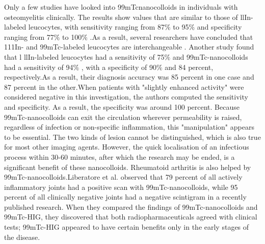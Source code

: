\documentclass[12pt]{article}
\begin{document}
Only a few studies have looked into 99mTcnanocolloids in individuals with osteomyelitis clinically. The results show values that are similar to those of llIn-labeled leucocytes, with sensitivity ranging from 87$\%$  to 95$\%$  and specificity ranging from 77$\%$  to 100$\%$ .As a result, several researchers have concluded that 111In- and 99mTc-labeled leucocytes are interchangeable . Another study  found that l llIn-labeled leucocytes had a sensitivity of 75$\%$  and 99mTc-nanocolloids had a sensitivity of 94$\%$ , with a specificity of 90$\%$  and 84 percent, respectively.As a result, their diagnosis accuracy was 85 percent in one case and 87 percent in the other.When patients with "slightly enhanced activity" were considered negative in this investigation, the authors computed the sensitivity and specificity. As a result, the specificity was around 100 percent. Because 99mTc-nanocolloids can exit the circulation wherever permeability is raised, regardless of infection or non-specific inflammation, this "manipulation" appears to be essential. The two kinds of lesion cannot be distinguished, which is also true for most other imaging agents. However, the quick localisation of an infectious process within 30-60 minutes, after which the research may be ended, is a significant benefit of these nanocolloids.
Rheumatoid arthritis is also helped by 99mTc-nanocolloids.Liberatore et al. observed that 79 percent of all actively inflammatory joints had a positive scan with 99mTc-nanocolloids, while 95 percent of all clinically negative joints had a negative scintigram in a recently published research. When they compared the findings of 99mTc-nanocolloids and 99mTc-HIG, they discovered that both radiopharmaceuticals agreed with clinical tests; 99mTc-HIG appeared to have certain benefits only in the early stages of the disease.
\end{document}
